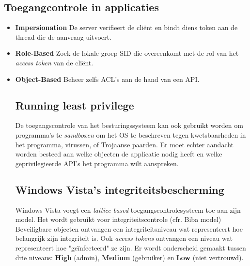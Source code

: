 \documentclass[../main.tex]{subfiles}
\begin{document}
\subsection{Toegangcontrole in applicaties}
\begin{itemize}
	\item \textbf{Impersionation} De server verifieert de cli\"ent en bindt diens token aan de thread die de aanvraag uitvoert.
	\item \textbf{Role-Based} Zoek de lokale groep SID die overeenkomt met de rol van het \textit{access token} van de cli\"ent.
	\item \textbf{Object-Based} Beheer zelfs ACL's aan de hand van een API.

\subsection{Running least privilege}
De toegangscontrole van het besturingssysteem kan ook gebruikt worden om programma's te \textit{sandboxen} om het OS te beschreven tegen kwetsbaarheden in het programma, virussen, of Trojaanse paarden. Er moet echter aandacht worden besteed aan welke objecten de applicatie nodig heeft en welke geprivilegieerde API's het programma wilt aanspreken.

\subsection{Windows Vista's integriteitsbescherming}
Windows Vista voegt een \textit{lattice-based} toegangscontrolesysteem toe aan zijn model. Het wordt gebruikt voor integriteitscontrole (cfr. Biba model) Beveiligbare objecten ontvangen een integriteitsniveau wat representeert hoe belangrijk zijn integriteit is. Ook \textit{access tokens} ontvangen een niveau wat representeert hoe "ge\"infecteerd" ze zijn. Er wordt onderscheid gemaakt tussen drie niveaus: \textbf{High} (admin), \textbf{Medium} (gebruiker) en \textbf{Low} (niet vertrouwd).

\end{itemize}
\end{document}
